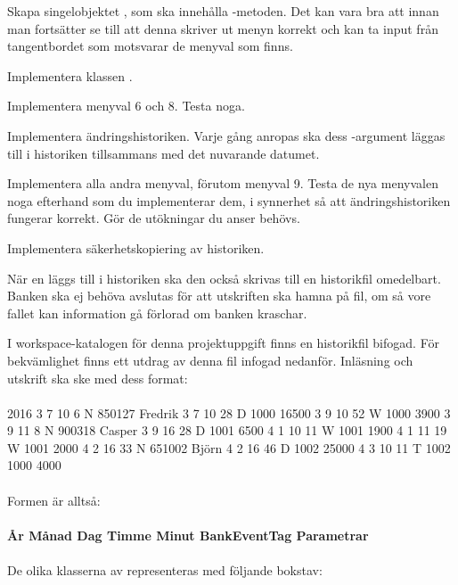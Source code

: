 \Task Skapa singelobjektet , som ska innehålla -metoden. Det kan vara bra att innan man fortsätter se till att denna skriver ut menyn korrekt och kan ta input från tangentbordet som motsvarar de menyval som finns.

\Task Implementera klassen .

\Subtask Implementera menyval 6 och 8. Testa noga.

\Subtask Implementera ändringshistoriken. Varje gång  anropas ska dess -argument läggas till i historiken tillsammans med det nuvarande datumet.

\Subtask Implementera alla andra menyval, förutom menyval 9. Testa de nya menyvalen noga efterhand som du implementerar dem, i synnerhet så att ändringshistoriken fungerar korrekt. Gör de utökningar du anser behövs.

\Task Implementera säkerhetskopiering av historiken.

\Subtask När en  läggs till i historiken ska den också skrivas till en historikfil omedelbart. Banken ska ej behöva avslutas för att utskriften ska hamna på fil, om så vore fallet kan information gå förlorad om banken kraschar.

I workspace-katalogen för denna projektuppgift finns en historikfil bifogad. För bekvämlighet finns ett utdrag av denna fil infogad nedanför. Inläsning och utskrift ska ske med dess format:\\~\\
2016 3 7 10 6 N 850127 Fredrik 3 7 10 28 D 1000 16500 3 9 10 52 W 1000 3900 3 9 11 8 N 900318 Casper 3 9 16 28 D 1001 6500 4 1 10 11 W 1001 1900 4 1 11 19 W 1001 2000 4 2 16 33 N 651002 Björn 4 2 16 46 D 1002 25000 4 3 10 11 T 1002 1000 4000\\~\\
Formen är alltså:\\~\\
\textbf{År  Månad  Dag  Timme  Minut  BankEventTag  Parametrar}
\\~\\
De olika klasserna av  representeras med följande bokstav:

